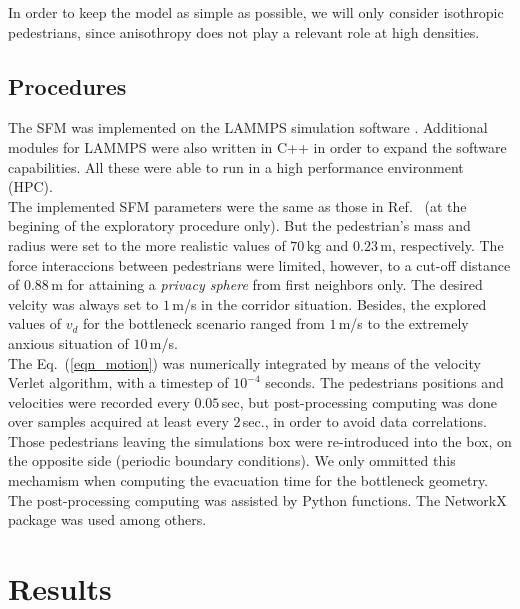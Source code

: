 \documentclass[preprint,12pt]{elsarticle}
\begin{document}
In order to keep the model as simple as possible, we will only consider 
isothropic pedestrians, since anisothropy does not play a relevant role at high 
densities. \\ 



\subsection{Procedures} 

The SFM was implemented on the LAMMPS simulation software \cite{plimpton}. 
Additional modules for LAMMPS were also written in C++ in order to expand the 
software capabilities. All these were able to run in a high performance 
environment (HPC). \\


The implemented SFM parameters were the same as those in 
Ref.~\cite{helbing_2000} (at the begining of the exploratory procedure only). 
But the pedestrian's mass and radius were set to the more realistic values of 
$70\,$kg and $0.23\,$m, respectively. The force interaccions between 
pedestrians were limited, however, to a cut-off distance of $0.88\,$m for 
attaining a \textit{privacy sphere} from first neighbors only. The desired 
velcity was always set to $1\,$m/s in the corridor situation. Besides, the 
explored values of $v_d$ for the bottleneck scenario ranged from $1\,$m/s to the 
extremely anxious situation of $10\,$m/s. \\


The Eq.~(\ref{eqn_motion}) was numerically integrated by means of the velocity 
Verlet algorithm, with a timestep of $10^{-4}$ seconds. The pedestrians 
positions and velocities were recorded every $0.05\,$sec, but post-processing 
computing was done over samples acquired at least every $2\,$sec., in order to avoid 
data correlations. Those pedestrians leaving the simulations box were 
re-introduced into the box, on the opposite side (periodic boundary 
conditions). We only ommitted this mechamism when computing the evacuation time 
for the bottleneck geometry. \\ 


The post-processing computing was assisted by Python functions. The NetworkX 
package was used among others.   \\



\section{\label{results}Results}
\end{document}
